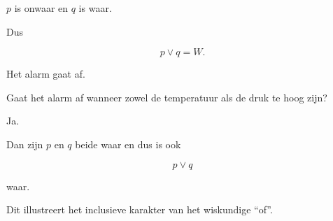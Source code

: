 \documentclass{ximera}
\begin{document}
\begin{oefening}{\oefU \ESS}
\begin{question}
\begin{oplossing}
$p$ is onwaar en $q$ is waar.

Dus

\[
p\lor q=W.
\]

Het alarm gaat af.

\end{oplossing}

\end{question}



\begin{question}

Gaat het alarm af wanneer zowel de temperatuur als de druk te hoog zijn?

\begin{oplossing}

Ja.

Dan zijn $p$ en $q$ beide waar en dus is ook

\[
p\lor q
\]

waar.

Dit illustreert het inclusieve karakter van het wiskundige ``of''.

\end{oplossing}

\end{question}

\end{oefening}
\end{document}
